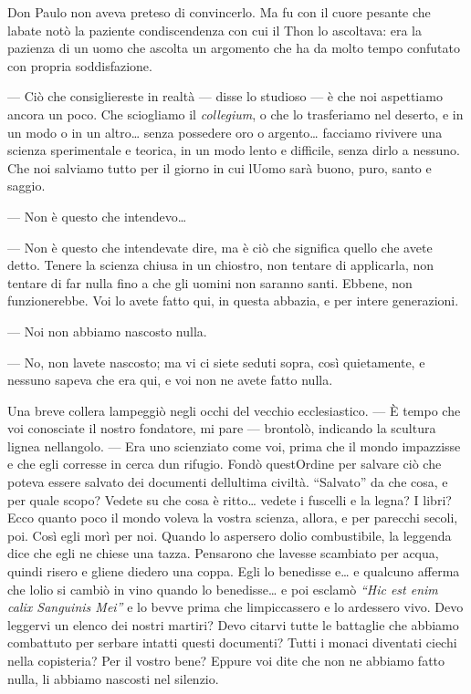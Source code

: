 Don Paulo non aveva preteso di convincerlo. Ma fu con il cuore pesante
che l\textquotesingle abate notò la paziente condiscendenza con cui il
Thon lo ascoltava: era la pazienza di un uomo che ascolta un argomento
che ha da molto tempo confutato con propria soddisfazione.

--- Ciò che consigliereste in realtà --- disse lo studioso --- è che noi
aspettiamo ancora un poco. Che sciogliamo il \emph{collegium}, o che lo
trasferiamo nel deserto, e in un modo o in un altro\ldots{} senza
possedere oro o argento\ldots{} facciamo rivivere una scienza
sperimentale e teorica, in un modo lento e difficile, senza dirlo a
nessuno. Che noi salviamo tutto per il giorno in cui
l\textquotesingle Uomo sarà buono, puro, santo e saggio.

--- Non è questo che intendevo\ldots{}

--- Non è questo che intendevate dire, ma è ciò che significa quello che
avete detto. Tenere la scienza chiusa in un chiostro, non tentare di
applicarla, non tentare di far nulla fino a che gli uomini non saranno
santi. Ebbene, non funzionerebbe. Voi lo avete fatto qui, in questa
abbazia, e per intere generazioni.

--- Noi non abbiamo nascosto nulla.

--- No, non l\textquotesingle avete nascosto; ma vi ci siete seduti
sopra, così quietamente, e nessuno sapeva che era qui, e voi non ne
avete fatto nulla.

Una breve collera lampeggiò negli occhi del vecchio ecclesiastico. --- È
tempo che voi conosciate il nostro fondatore, mi pare --- brontolò,
indicando la scultura lignea nell\textquotesingle angolo. --- Era uno
scienziato come voi, prima che il mondo impazzisse e che egli corresse
in cerca d\textquotesingle un rifugio. Fondò
quest\textquotesingle Ordine per salvare ciò che poteva essere salvato
dei documenti dell\textquotesingle ultima civiltà. ``Salvato'' da che
cosa, e per quale scopo? Vedete su che cosa è ritto\ldots{} vedete i
fuscelli e la legna? I libri? Ecco quanto poco il mondo voleva la vostra
scienza, allora, e per parecchi secoli, poi. Così egli morì per noi.
Quando lo aspersero d\textquotesingle olio combustibile, la leggenda
dice che egli ne chiese una tazza. Pensarono che
l\textquotesingle avesse scambiato per acqua, quindi risero e gliene
diedero una coppa. Egli lo benedisse e\ldots{} e qualcuno afferma che
l\textquotesingle olio si cambiò in vino quando lo benedisse\ldots{} e
poi esclamò \emph{``Hic est enim calix Sanguinis Mei''} e lo bevve prima
che l\textquotesingle impiccassero e lo ardessero vivo. Devo leggervi un
elenco dei nostri martiri? Devo citarvi tutte le battaglie che abbiamo
combattuto per serbare intatti questi documenti? Tutti i monaci
diventati ciechi nella copisteria? Per il vostro bene? Eppure voi dite
che non ne abbiamo fatto nulla, li abbiamo nascosti nel silenzio.


